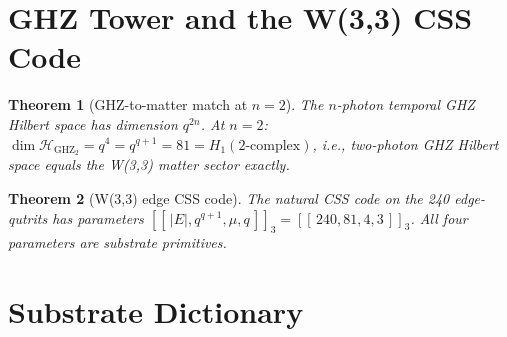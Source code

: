 \documentclass[11pt]{article}
\newtheorem{theorem}{Theorem}
\begin{document}
\section{GHZ Tower and the W(3,3) CSS Code}

\begin{theorem}[GHZ-to-matter match at $n=2$]\label{thm:ghz}
The $n$-photon temporal GHZ Hilbert space has dimension $q^{2n}$.
At $n = 2$:
$\dim\mathcal H_{\mathrm{GHZ}_2} = q^4 = q^{q+1} = 81 = H_1(2\text{-complex})$,
i.e., two-photon GHZ Hilbert space equals the W(3,3) matter sector exactly.
\end{theorem}

\begin{theorem}[W(3,3) edge CSS code]\label{thm:css}
The natural CSS code on the 240 edge-qutrits has parameters
$[[\,|E|, q^{q+1}, \mu, q\,]]_3 = [[\,240, 81, 4, 3\,]]_3$.  All four
parameters are substrate primitives.
\end{theorem}

\section{Substrate Dictionary}
\end{document}
